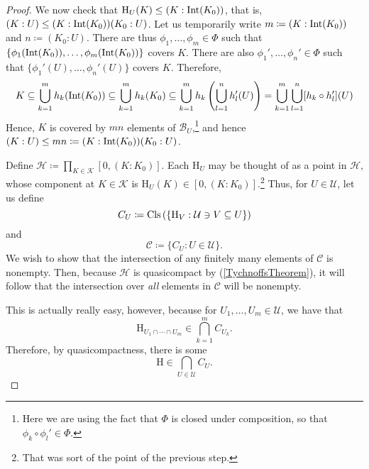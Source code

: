 \begin{thm}
\begin{proof}
We now check that $\mathrm{H}_U(K)\leq (K:\operatorname{Int} (K_0))$, that is, $(K:U)\leq (K:\operatorname{Int} (K_0))(K_0:U)$.  Let us temporarily write $m\coloneqq (K:\operatorname{Int} (K_0))$ and $n\coloneqq (K_0:U)$.  There are thus $\phi _1,\ldots ,\phi _m\in \Phi$ such that $\{ \phi _1(\operatorname{Int} (K_0)),\ldots ,\phi _m(\operatorname{Int} (K_0))\}$ covers $K$.  There are also $\phi _1',\ldots ,\phi _n'\in \Phi$ such that $\{ \phi _1'(U),\ldots ,\phi _n'(U)\}$ covers $K$.  Therefore,
\begin{equation}
K\subseteq \bigcup _{k=1}^mh_k(\operatorname{Int} (K_0))\subseteq \bigcup _{k=1}^mh_k(K_0)\subseteq \bigcup _{k=1}^mh_k\left( \bigcup _{l=1}^nh_l'(U)\right) =\bigcup _{k=1}^m\bigcup _{l=1}^n[h_k\circ h_l'](U)
\end{equation}
Hence, $K$ is covered by $mn$ elements of $\mathcal{B}_U$,\footnote{Here we are using the fact that $\Phi$ is closed under composition, so that $\phi _k\circ \phi _l'\in \Phi$.} and hence $(K:U)\leq mn\coloneqq (K:\operatorname{Int} (K_0))(K_0:U)$.

\label{Haar.4x}
Define $\mathcal{H}\coloneqq \prod _{K\in \mathcal{K}}[0,(K:K_0)]$.  Each $\mathrm{H}_U$ may be thought of as a point in $\mathcal{H}$, whose component at $K\in \mathcal{K}$ is $\mathrm{H}_U(K)\in [0,(K:K_0)]$.\footnote{That was sort of the point of the previous step.}  Thus, for $U\in \mathcal{U}$, let us define
\begin{equation}
C_U\coloneqq \operatorname{Cls} \left( \left\{ \mathrm{H}_V:\mathcal{U}\ni V\subseteq U\right\} \right) 
\end{equation}
and
\begin{equation}
\mathcal{C}\coloneqq \{ C_U:U\in \mathcal{U}\} .
\end{equation}
We wish to show that the intersection of any finitely many elements of $\mathcal{C}$ is nonempty.  Then, because $\mathcal{H}$ is quasicompact by  (\cref{TychnoffsTheorem}), it will follow that the intersection over \emph{all} elements in $\mathcal{C}$ will be nonempty.

This is actually really easy, however, because for $U_1,\ldots ,U_m\in \mathcal{U}$, we have that
\begin{equation}
\mathrm{H}_{U_1\cap \cdots \cap U_m}\in \bigcap _{k=1}^mC_{U_k}.
\end{equation}
Therefore, by quasicompactness, there is some
\begin{equation}
\mathrm{H}\in \bigcap _{U\in \mathcal{U}}C_U.
\end{equation}


\end{proof}
\end{thm}
